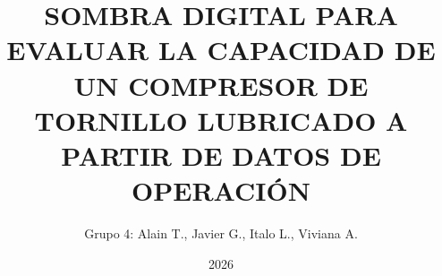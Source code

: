 \documentclass[a4paper,12pt,oneside]{tesisutec}
\begin{document}
\frontmatter

\department{}

\title{SOMBRA DIGITAL PARA EVALUAR LA CAPACIDAD DE UN COMPRESOR DE TORNILLO LUBRICADO A PARTIR DE DATOS DE OPERACIÓN}

\author{Grupo 4: Alain T., Javier G., Italo L., Viviana A.}

\date{2026}

\maketitle



%
%

\tableofcontents

\newpage

\listoftables

\newpage

\listoffigures


\mainmatter
\pagestyle{fancy}

%
% 
%




%

\renewcommand{\bibname}{\hfill\Large\bf{REFERENCIAS BIBLIOGRÁFICAS}\hfill}




\end{document}

